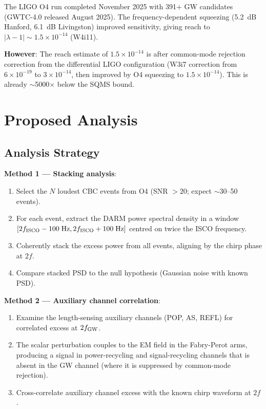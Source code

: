 \documentclass[11pt]{article}
\newcommand{\ee}[1]{\times 10^{#1}}
\newcommand{\lbone}{|\lambda - 1|}
\begin{document}
The LIGO O4 run completed November 2025 with 391+ GW candidates
(GWTC-4.0 released August 2025). The frequency-dependent squeezing
(5.2~dB Hanford, 6.1~dB Livingston) improved sensitivity, giving
reach to $\lbone \sim 1.5\ee{-14}$ (W4i11).

\textbf{However}: The reach estimate of $1.5\ee{-14}$ is after
common-mode rejection correction from the differential LIGO
configuration (W3i7 correction from $6\ee{-19}$ to $3\ee{-14}$,
then improved by O4 squeezing to $1.5\ee{-14}$). This is already
$\sim$5000$\times$ below the SQMS bound.


\section{Proposed Analysis}
\label{sec:ligo-analysis}

\subsection{Analysis Strategy}

\textbf{Method 1 --- Stacking analysis}:
\begin{enumerate}[nosep]
\item Select the $N$ loudest CBC events from O4 (SNR $> 20$;
  expect $\sim$30--50 events).
\item For each event, extract the DARM power spectral density in
  a window $[2f_{\rm ISCO} - 100\;\text{Hz}, 2f_{\rm ISCO} +
  100\;\text{Hz}]$ centred on twice the ISCO frequency.
\item Coherently stack the excess power from all events, aligning
  by the chirp phase at $2f$.
\item Compare stacked PSD to the null hypothesis (Gaussian noise
  with known PSD).
\end{enumerate}

\textbf{Method 2 --- Auxiliary channel correlation}:
\begin{enumerate}[nosep]
\item Examine the length-sensing auxiliary channels (POP, AS,
  REFL) for correlated excess at $2f_{\rm GW}$.
\item The scalar perturbation couples to the EM field in the
  Fabry-Perot arms, producing a signal in power-recycling and
  signal-recycling channels that is absent in the GW channel
  (where it is suppressed by common-mode rejection).
\item Cross-correlate auxiliary channel excess with the known
  chirp waveform at $2f$.
\end{enumerate}
\end{document}
